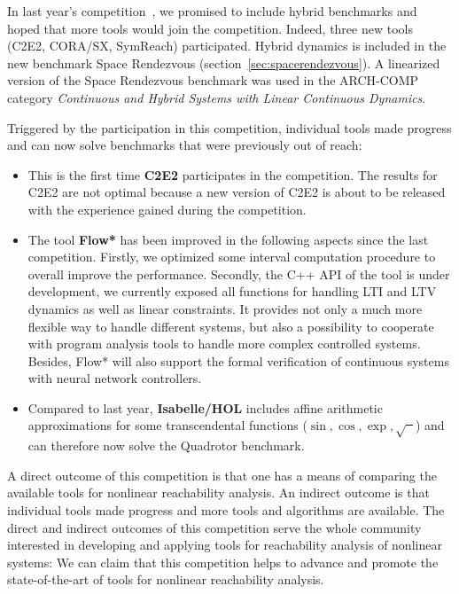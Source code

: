 \documentclass[EPiC]{easychair}
\begin{document}
In last year's competition~\cite{ARCH_COMP17}, we promised to include hybrid benchmarks and hoped that more tools would join the competition.
Indeed, three new tools (C2E2, CORA/SX, SymReach) participated. Hybrid dynamics is included in the new benchmark Space Rendezvous (section~\ref{sec:spacerendezvous}). A linearized version of the Space Rendezvous benchmark was used in the ARCH-COMP category \textit{Continuous and Hybrid Systems with Linear Continuous Dynamics}.

Triggered by the participation in this competition, individual tools made progress and can now solve benchmarks that were previously out of reach:
\begin{itemize}
\item This is the first time \textbf{C2E2} participates in the competition. The results for C2E2 are not optimal because a new version of C2E2 is about to be released with the experience gained during the competition. 
\item The tool \textbf{Flow*} has been improved in the following aspects since the last competition. Firstly, we optimized some interval computation procedure to overall improve the performance. Secondly, the C++ API of the tool is under development, we currently exposed all functions for handling LTI and LTV dynamics as well as linear constraints. It provides not only a much more flexible way to handle different systems, but also a possibility to cooperate with program analysis tools to handle more complex controlled systems. Besides, Flow* will also support the formal verification of continuous systems with neural network controllers.
\item Compared to last year, \textbf{Isabelle/HOL} includes affine arithmetic approximations for some transcendental functions ($\sin,\cos,\exp,\sqrt{\phantom{x}}$) and can therefore now solve the Quadrotor benchmark.
\end{itemize}

A direct outcome of this competition is that one has a means of comparing the available tools for nonlinear reachability analysis. An indirect outcome is that individual tools made progress and more tools and algorithms are available.
The direct and indirect outcomes of this competition serve the whole community interested in developing and applying tools for reachability analysis of nonlinear systems: We can claim that this competition helps to advance and promote the state-of-the-art of tools for nonlinear reachability analysis.
\end{document}
